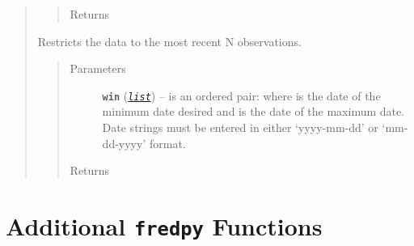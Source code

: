 \documentclass[letterpaper,10pt,english]{sphinxmanual}
\begin{document}
\begin{fulllineitems}
\begin{quote}
\begin{fulllineitems}
\begin{quote}
\begin{description}
\item[{Returns}] \leavevmode
{\hyperref[series_class:fredpy.series]{}}

\end{description}\end{quote}

\end{fulllineitems}


\begin{fulllineitems}
\label{series_class:fredpy.series.window}
Restricts the data to the most recent N observations.
\begin{quote}\begin{description}
\item[{Parameters}] \leavevmode
\textbf{\texttt{win}} (\href{https://docs.python.org/2/library/functions.html\#list}{\emph{\texttt{list}}}) -- is an ordered pair:  where  is the date of the minimum date desired and  is the date of the maximum date. Date strings must be entered in either `yyyy-mm-dd' or `mm-dd-yyyy' format.

\item[{Returns}] \leavevmode
{\hyperref[series_class:fredpy.series]{}}

\end{description}\end{quote}

\end{fulllineitems}

\end{quote}

\end{fulllineitems}



\chapter{Additional \texttt{fredpy} Functions}
\label{additional_functions::doc}\label{additional_functions:additional-fredpy-functions}
\end{document}
